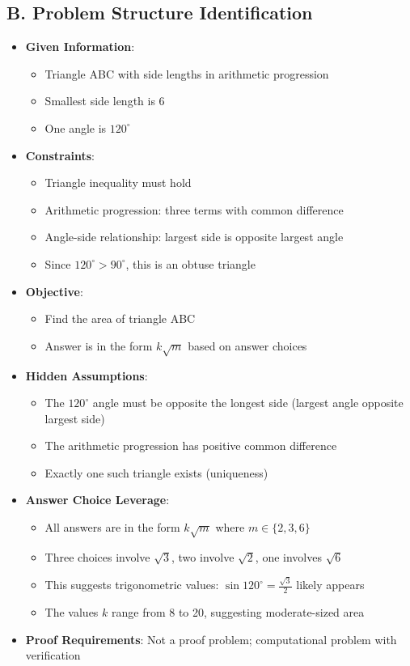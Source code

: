 \documentclass[12pt]{article}
\begin{document}
\begin{problemconfigbox}
\subsection*{B. Problem Structure Identification}
\begin{itemize}[leftmargin=*]
    \item \textbf{Given Information}: 
    \begin{itemize}
        \item Triangle ABC with side lengths in arithmetic progression
        \item Smallest side length is 6
        \item One angle is $120^\circ$
    \end{itemize}
    \item \textbf{Constraints}: 
    \begin{itemize}
        \item Triangle inequality must hold
        \item Arithmetic progression: three terms with common difference
        \item Angle-side relationship: largest side is opposite largest angle
        \item Since $120^\circ > 90^\circ$, this is an obtuse triangle
    \end{itemize}
    \item \textbf{Objective}: 
    \begin{itemize}
        \item Find the area of triangle ABC
        \item Answer is in the form $k\sqrt{m}$ based on answer choices
    \end{itemize}
    \item \textbf{Hidden Assumptions}: 
    \begin{itemize}
        \item The $120^\circ$ angle must be opposite the longest side (largest angle opposite largest side)
        \item The arithmetic progression has positive common difference
        \item Exactly one such triangle exists (uniqueness)
    \end{itemize}
    \item \textbf{Answer Choice Leverage}: 
    \begin{itemize}
        \item All answers are in the form $k\sqrt{m}$ where $m \in \{2, 3, 6\}$
        \item Three choices involve $\sqrt{3}$, two involve $\sqrt{2}$, one involves $\sqrt{6}$
        \item This suggests trigonometric values: $\sin 120^\circ = \frac{\sqrt{3}}{2}$ likely appears
        \item The values $k$ range from 8 to 20, suggesting moderate-sized area
    \end{itemize}
    \item \textbf{Proof Requirements}: Not a proof problem; computational problem with verification
\end{itemize}


\end{problemconfigbox}
\end{document}

